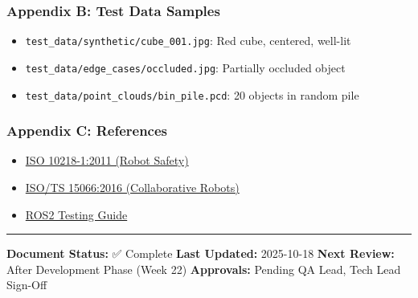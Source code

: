 \documentclass[
]{article}
\providecommand{\tightlist}{%
  \setlength{\itemsep}{0pt}\setlength{\parskip}{0pt}}
\begin{document}
\hypertarget{appendix-b-test-data-samples}{%
\subsubsection{Appendix B: Test Data
Samples}\label{appendix-b-test-data-samples}}

\begin{itemize}
\tightlist
\item
  \texttt{test\_data/synthetic/cube\_001.jpg}: Red cube, centered,
  well-lit
\item
  \texttt{test\_data/edge\_cases/occluded.jpg}: Partially occluded
  object
\item
  \texttt{test\_data/point\_clouds/bin\_pile.pcd}: 20 objects in random
  pile
\end{itemize}

\hypertarget{appendix-c-references}{%
\subsubsection{Appendix C: References}\label{appendix-c-references}}

\begin{itemize}
\tightlist
\item
  \href{https://www.iso.org/standard/51330.html}{ISO 10218-1:2011 (Robot
  Safety)}
\item
  \href{https://www.iso.org/standard/62996.html}{ISO/TS 15066:2016
  (Collaborative Robots)}
\item
  \href{https://docs.ros.org/en/humble/Tutorials/Intermediate/Testing/Testing-Main.html}{ROS2
  Testing Guide}
\end{itemize}

\begin{center}\rule{0.5\linewidth}{0.5pt}\end{center}

\textbf{Document Status:} ✅ Complete \textbf{Last Updated:} 2025-10-18
\textbf{Next Review:} After Development Phase (Week 22)
\textbf{Approvals:} Pending QA Lead, Tech Lead Sign-Off
\end{document}
